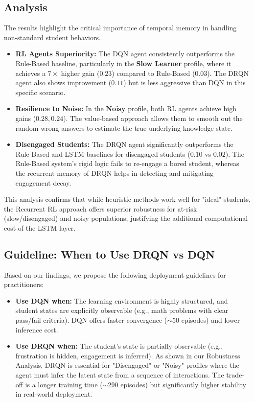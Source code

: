 \documentclass[conference]{IEEEtran}
\begin{document}
\subsection{Analysis}
The results highlight the critical importance of temporal memory in handling non-standard student behaviors.
\begin{itemize}
    \item \textbf{RL Agents Superiority:} The DQN agent consistently outperforms the Rule-Based baseline, particularly in the \textbf{Slow Learner} profile, where it achieves a $7\times$ higher gain ($0.23$) compared to Rule-Based ($0.03$). The DRQN agent also shows improvement ($0.11$) but is less aggressive than DQN in this specific scenario.
    \item \textbf{Resilience to Noise:} In the \textbf{Noisy} profile, both RL agents achieve high gains ($0.28, 0.24$). The value-based approach allows them to smooth out the random wrong answers to estimate the true underlying knowledge state.
    \item \textbf{Disengaged Students:} The DRQN agent significantly outperforms the Rule-Based and LSTM baselines for disengaged students ($0.10$ vs $0.02$). The Rule-Based system's rigid logic fails to re-engage a bored student, whereas the recurrent memory of DRQN helps in detecting and mitigating engagement decay.
\end{itemize}

This analysis confirms that while heuristic methods work well for "ideal" students, the Recurrent RL approach offers superior robustness for at-risk (slow/disengaged) and noisy populations, justifying the additional computational cost of the LSTM layer.

\subsection{Guideline: When to Use DRQN vs DQN}
Based on our findings, we propose the following deployment guidelines for practitioners:
\begin{itemize}
    \item \textbf{Use DQN when:} The learning environment is highly structured, and student states are explicitly observable (e.g., math problems with clear pass/fail criteria). DQN offers faster convergence ($\sim$50 episodes) and lower inference cost.
    \item \textbf{Use DRQN when:} The student's state is partially observable (e.g., frustration is hidden, engagement is inferred). As shown in our Robustness Analysis, DRQN is essential for "Disengaged" or "Noisy" profiles where the agent must infer the latent state from a sequence of interactions. The trade-off is a longer training time ($\sim$290 episodes) but significantly higher stability in real-world deployment.
\end{itemize}
\end{document}

